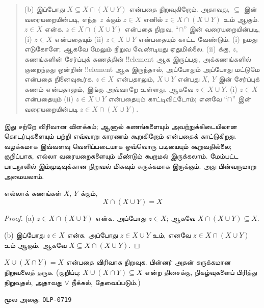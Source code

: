 \documentclass[11pt,a4paper,openany]{memoir}
\makeatletter
\newcommand\TADriverHeadingMode{\def\ol@chaptercs{section}\def\ol@partcs{section}}
\makeatother
\begin{document}
\begin{explain}
\begin{quote}
(b) இப்போது $X \subseteq X \cap (X \cup Y)$ என்பதை
நிறுவுகிறோம். அதாவது, $\subseteq$ இன் வரையறையின்படி,
எந்த~$z$ க்கும் $z \in X$ எனில்
$z \in X \cap (X \cup Y)$ உம் ஆகும்.
$z \in X$ என்க. $z \in X \cap (X \cup Y)$ என்பதை
நிறுவ, ``$\cap$'' இன் வரையறையின்படி, (i) $z \in X$
என்பதையும் (ii) $z \in X \cup Y$ என்பதையும் காட்ட வேண்டும்.
(i) நமது எடுகோளே; ஆகவே மேலும் நிறுவ வேண்டியது ஏதுமில்லை.
(ii) க்கு, $z$, கணங்களின் சேர்ப்புக் கணத்தின் !!{element}
ஆக இருப்பது, அக்கணங்களில் குறைந்தது ஒன்றின் !!{element}
ஆக இருந்தால், அப்போதும் அப்போது மட்டுமே என்பதை நினைவுகூர்க.
$z \in X$ என்பதாலும், $X \cup Y$ என்பது $X$, $Y$ இன்
சேர்ப்புக் கணம் என்பதாலும், இங்கு அவ்வாறே உள்ளது.
ஆகவே $z \in X \cup Y$. (i) $z \in X$ என்பதையும்
(ii) $z \in X \cup Y$ என்பதையும் காட்டிவிட்டோம்;
எனவே ``$\cap$'' இன் வரையறையின்படி
$z \in X \cap (X \cup Y)$.
\end{quote}

இது சற்றே விரிவான விளக்கம்; ஆனால் கணங்களையும்
அவற்றுக்கிடையிலான தொடர்புகளையும் பற்றி எவ்வாறு காரணம்
கூறுகிறோம் என்பதைக் காட்டுகிறது. வழக்கமாக இவ்வளவு
வெளிப்படையாக ஒவ்வொரு படியையும் கூறுவதில்லை; குறிப்பாக,
எல்லா வரையறைகளையும் மீண்டும் கூறாமல் இருக்கலாம்.
மேம்பட்ட பாடநூலில் இம்முடிவுக்கான நிறுவல் மிகவும்
சுருக்கமாக இருக்கும். அது பின்வருமாறு அமையலாம்.
\end{explain}

\begin{prop}[உட்கவர் பண்பு]
எல்லாக் கணங்கள் $X$, $Y$ க்கும்,
\[
X \cap (X \cup Y) = X
\]
\end{prop}

\begin{proof}
(a) $z \in X \cap (X \cup Y)$ என்க. அப்போது $z \in X$;
ஆகவே $X \cap (X \cup Y) \subseteq X$.

(b) இப்போது $z \in X$ என்க. அப்போது $z \in X \cup Y$
உம், எனவே $z \in X \cap (X \cup Y)$ உம் ஆகும்.
ஆகவே $X \subseteq X \cap (X \cup Y)$.
\end{proof}

\begin{prob}
$X \cup (X \cap Y) = X$ என்பதை விரிவாக நிறுவுக.
பின்னர் அதன் சுருக்கமான நிறுவலைத் தருக.
(குறிப்பு: $X \cup (X \cap Y) \subseteq X$ என்ற திசைக்கு,
நிகழ்வுகளைப் பிரித்து நிறுவுதல், அதாவது $\lor$ நீக்கல்,
தேவைப்படும்.)
\end{prob}



\clearpage
\noindent மூல அலகு: \texttt{OLP-0719}\par
\begingroup
\TADriverHeadingMode
{}
\end{document}
